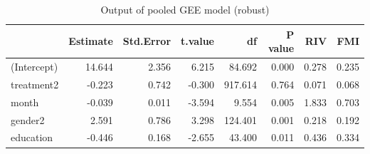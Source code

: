 \begin{table}[H]
\centering
\begin{tabular}{|l|r|r|r|r|r|r|r|}
\hline
  & Estimate & Std.Error & t.value & df & P value & RIV & FMI\\
\hline
(Intercept) & 14.644 & 2.356 & 6.215 & 84.692 & 0.000 & 0.278 & 0.235\\
\hline
treatment2 & -0.223 & 0.742 & -0.300 & 917.614 & 0.764 & 0.071 & 0.068\\
\hline
month & -0.039 & 0.011 & -3.594 & 9.554 & 0.005 & 1.833 & 0.703\\
\hline
gender2 & 2.591 & 0.786 & 3.298 & 124.401 & 0.001 & 0.218 & 0.192\\
\hline
education & -0.446 & 0.168 & -2.655 & 43.400 & 0.011 & 0.436 & 0.334\\
\hline
\end{tabular}
\caption{Output of pooled GEE model (robust)}
\label{tab:gee.mi.robust}
\end{table}